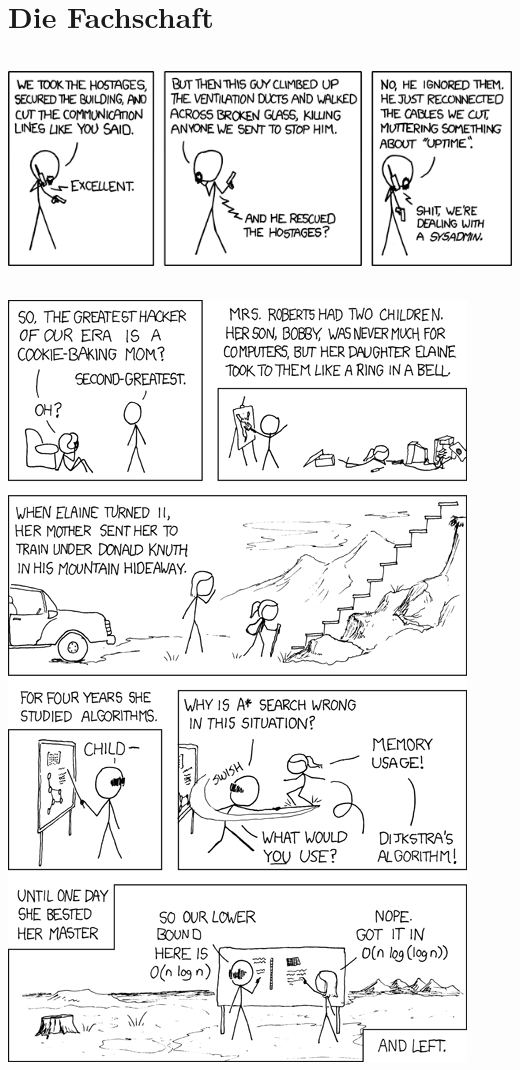 \documentclass[12pt,a4paper]{scrartcl}
\begin{document}
    \section{Die Fachschaft}
    
    \begin{center}
        \includegraphics[height=6cm]{comics/devotion_to_duty.png}
    \end{center}
    \newpage
    \begin{center}
        \includegraphics[height=\textheight]{comics/1337_part_2.png}
    \end{center}


	
	
\end{document}
